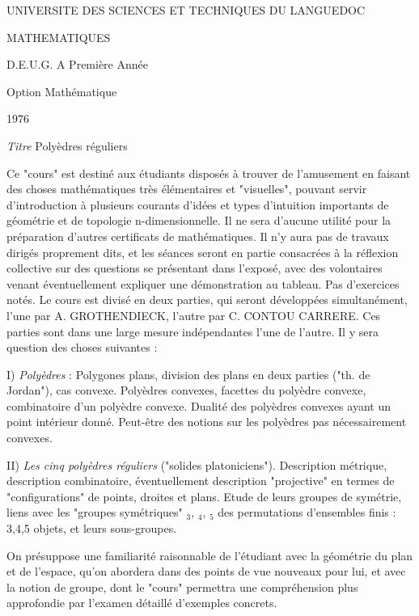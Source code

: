 \documentclass[11pt,a4paper]{article}
\begin{document}

UNIVERSITE DES SCIENCES ET TECHNIQUES DU LANGUEDOC

MATHEMATIQUES

D.E.U.G. A Première Année

Option Mathématique

1976

\emph{Titre} Polyèdres réguliers

Ce "cours" est destiné aux étudiants disposés à trouver de l'amusement en
faisant des choses mathématiques très élémentaires et "visuelles", pouvant
servir d'introduction à plusieurs courants d'idées et types d'intuition
importants de géométrie et de topologie n-dimensionnelle. Il ne sera d'aucune
utilité pour la préparation d'autres certificats de mathématiques. Il n'y
aura pas de travaux dirigés proprement dits, et les séances seront en partie
consacrées à la réflexion collective sur des questions se présentant dans
l'exposé, avec des volontaires venant éventuellement expliquer une démonstration
au tableau. Pas d'exercices notés. Le cours est divisé en deux parties, qui
seront développées simultanément, l'une par A. GROTHENDIECK, l'autre par
C. CONTOU CARRERE. Ces parties sont dans une large mesure indépendantes l'une
de l'autre. Il y sera question des choses suivantes :

I) \emph{Polyèdres} : Polygones plans, division des plans en deux parties ("th. de
Jordan"), cas convexe. Polyèdres convexes, facettes du polyèdre convexe,
combinatoire d'un polyèdre convexe. Dualité des polyèdres convexes ayant un
point intérieur donné. Peut-être des notions sur les polyèdres pas nécessairement
convexes.

II) \emph{Les cinq polyèdres réguliers} ("solides platoniciens"). Description métrique,
description combinatoire, éventuellement description "projective" en termes
de "configurations" de points, droites et plans. Etude de leurs groupes de
symétrie, liens avec les "groupes symétriques" $_{3}$,
$_{4}$, $_{5}$ des permutations
d'ensembles finis : 3,4,5 objets, et leurs sous-groupes.

On présuppose une familiarité raisonnable de l'étudiant avec la géométrie
du plan et de l'espace, qu'on abordera dans des points de vue nouveaux pour lui,
et avec la notion de groupe, dont le "cours" permettra une compréhension plus
approfondie par l'examen détaillé d'exemples concrets.
\end{document}
